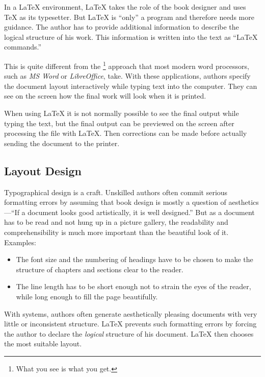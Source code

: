 In a \LaTeX{} environment, \LaTeX{} takes the role of the book designer and
uses \TeX{} as its typesetter. But \LaTeX{} is \enquote{only} a program and
therefore needs more guidance. The author has to provide additional information
to describe the logical structure of his work. This information is written into
the text as \enquote{\LaTeX{} commands.}

This is quite different from the \footnote{What you see is
  what you get.} approach that most modern word processors, such as
\emph{MS Word} or \emph{LibreOffice}, take. With these
applications, authors specify the document layout interactively while
typing text into the computer. They can see on the
screen how the final work will look when it is printed.

When using \LaTeX{} it is not normally possible to see the final output
while typing the text, but the final output can be previewed on the
screen after processing the file with \LaTeX. Then corrections can be
made before actually sending the document to the printer.

\subsection{Layout Design}\label{sec:layout_design}

Typographical design is a craft. Unskilled authors often commit
serious formatting errors by assuming that book design is mostly a
question of aesthetics---\enquote{If a document looks good artistically,
  it is well designed.} But as a document has to be read and not hung
up in a picture gallery, the readability and comprehensibility is
much more important than the beautiful look of it.
Examples:
\begin{itemize}
  \item The font size and the numbering of headings have to be chosen to make
        the structure of chapters and sections clear to the reader.
  \item The line length has to be short enough not to strain
        the eyes of the reader, while long enough to fill the page
        beautifully.
\end{itemize}

With  systems, authors often generate aesthetically
pleasing documents with very little or inconsistent structure.
\LaTeX{} prevents such formatting errors by forcing the author to
declare the \emph{logical} structure of his document. \LaTeX{} then
chooses the most suitable layout.

